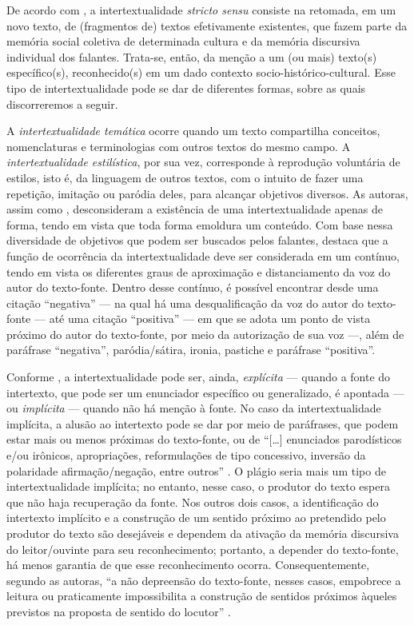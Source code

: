 \documentclass{textolivre}
\begin{document}
De acordo com \textcite{koch_intertextualidade:_2012}, a intertextualidade \textit{stricto sensu} consiste na retomada, em um novo texto, de (fragmentos de) textos efetivamente existentes, que fazem parte da memória social coletiva de determinada cultura e da memória discursiva individual dos falantes. Trata-se, então, da menção a um (ou mais) texto(s) específico(s), reconhecido(s) em um dado contexto socio-histórico-cultural. Esse tipo de intertextualidade pode se dar de diferentes formas, sobre as quais discorreremos a seguir.

A \textit{intertextualidade temática} ocorre quando um texto compartilha conceitos, nomenclaturas e terminologias com outros textos do mesmo campo. A \textit{intertextualidade estilística}, por sua vez, corresponde à reprodução voluntária de estilos, isto é, da linguagem de outros textos, com o intuito de fazer uma repetição, imitação ou paródia deles, para alcançar objetivos diversos. As autoras, assim como \textcite{koch__1991}, desconsideram a existência de uma intertextualidade apenas de forma, tendo em vista que toda forma emoldura um conteúdo. Com base nessa diversidade de objetivos que podem ser buscados pelos falantes, \textcite{mozdzenski_intertextualidade_2013} destaca que a função de ocorrência da intertextualidade deve ser considerada em um contínuo, tendo em vista os diferentes graus de aproximação e distanciamento da voz do autor do texto-fonte. Dentro desse contínuo, é possível encontrar desde uma citação “negativa” — na qual há uma desqualificação da voz do autor do texto-fonte — até uma citação “positiva” — em que se adota um ponto de vista próximo do autor do texto-fonte, por meio da autorização de sua voz —, além de paráfrase “negativa”, paródia/sátira, ironia, pastiche e paráfrase “positiva”.

Conforme \textcite{koch_intertextualidade:_2012}, a intertextualidade pode ser, ainda, \textit{explícita} — quando a fonte do intertexto, que pode ser um enunciador específico ou generalizado, é apontada — ou \textit{implícita} — quando não há menção à fonte. No caso da intertextualidade implícita, a alusão ao intertexto pode se dar por meio de paráfrases, que podem estar mais ou menos próximas do texto-fonte, ou de “[…] enunciados parodísticos e/ou irônicos, apropriações, reformulações de tipo concessivo, inversão da polaridade afirmação/negação, entre outros” \cite[p. 31]{koch_intertextualidade:_2012}. O plágio seria mais um tipo de intertextualidade implícita; no entanto, nesse caso, o produtor do texto espera que não haja recuperação da fonte. Nos outros dois casos, a identificação do intertexto implícito e a construção de um sentido próximo ao pretendido pelo produtor do texto são desejáveis e dependem da ativação da memória discursiva do leitor/ouvinte para seu reconhecimento; portanto, a depender do texto-fonte, há menos garantia de que esse reconhecimento ocorra. Consequentemente, segundo as autoras, “a não depreensão do texto-fonte, nesses casos, empobrece a leitura ou praticamente impossibilita a construção de sentidos próximos àqueles previstos na proposta de sentido do locutor” \cite[p. 36]{koch_intertextualidade:_2012}. 
\end{document}
